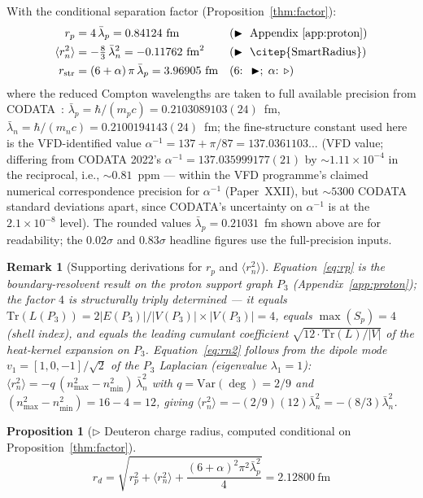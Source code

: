 \documentclass[12pt]{article}
\newtheorem{proposition}[theorem]{Proposition}
\newtheorem{remark}[theorem]{Remark}
\newcommand{\lbar}{\bar{\lambda}}
\begin{document}
With the conditional separation factor (Proposition~\ref{thm:factor}):
\begin{align}
    r_p &= 4\,\lbar_p = 0.84124~\text{fm}
    && (\blacktriangleright\text{ Appendix~\ref{app:proton}}) \label{eq:rp} \\
    \langle r_n^2\rangle &= -\tfrac{8}{3}\,\lbar_n^2 = -0.11762~\text{fm}^2
    && (\blacktriangleright\text{ \citep{SmartRadius}}) \label{eq:rn2} \\
    r_{\mathrm{str}} &= (6 + \alpha)\,\pi\,\lbar_p = 3.96905~\text{fm}
    && (6\text{: }\blacktriangleright;\;\alpha\text{: }\triangleright)
    \label{eq:rstr}
\end{align}
where the reduced Compton wavelengths are taken to full available precision from CODATA~\citep{CODATA2022}: $\lbar_p = \hbar/(m_p c) = 0.2103089103(24)$~fm, $\lbar_n = \hbar/(m_n c) = 0.2100194143(24)$~fm; the fine-structure constant used here is the VFD-identified value $\alpha^{-1} = 137 + \pi/87 = 137.0361103...$ (VFD value; differing from CODATA 2022's $\alpha^{-1} = 137.035999177(21)$ by $\sim 1.11 \times 10^{-4}$ in the reciprocal, i.e., $\sim 0.81$~ppm --- within the VFD programme's claimed numerical correspondence precision for $\alpha^{-1}$ (Paper~XXII), but $\sim 5300$ CODATA standard deviations apart, since CODATA's uncertainty on $\alpha^{-1}$ is at the $2.1 \times 10^{-8}$ level). The rounded values $\lbar_p = 0.21031$~fm shown above are for readability; the $0.02\sigma$ and $0.83\sigma$ headline figures use the full-precision inputs.

\begin{remark}[Supporting derivations for $r_p$ and $\langle r_n^2 \rangle$]
Equation~\eqref{eq:rp} is the boundary-resolvent result on the proton
support graph $P_3$ (Appendix~\ref{app:proton}); the factor $4$ is
\textit{structurally triply determined} --- it equals
$\mathrm{Tr}(L(P_3)) = 2|E(P_3)|/|V(P_3)| \times |V(P_3)| = 4$, equals
$\max(S_p) = 4$ (shell index), and equals the leading cumulant
coefficient $\sqrt{12 \cdot \mathrm{Tr}(L)/|V|}$ of the heat-kernel
expansion on $P_3$. Equation~\eqref{eq:rn2} follows from the dipole
mode $v_1 = [1, 0, -1]/\sqrt{2}$ of the $P_3$ Laplacian (eigenvalue
$\lambda_1 = 1$): $\langle r_n^2 \rangle = -q \,(n_{\max}^2 -
n_{\min}^2)\,\lbar_n^2$ with $q = \mathrm{Var}(\deg) = 2/9$ and
$(n_{\max}^2 - n_{\min}^2) = 16 - 4 = 12$, giving
$\langle r_n^2 \rangle = -(2/9)(12)\lbar_n^2 = -(8/3)\lbar_n^2$.
\end{remark}

\begin{proposition}[$\triangleright$ Deuteron charge radius, computed conditional on Proposition~\ref{thm:factor}]\label{prop:deuteron}
\begin{equation}\label{eq:rd}
    r_d = \sqrt{r_p^2 + \langle r_n^2\rangle +
    \frac{(6{+}\alpha)^2\pi^2\lbar_p^2}{4}}
    = 2.12800~\text{fm}
\end{equation}
\end{proposition}
\end{document}
